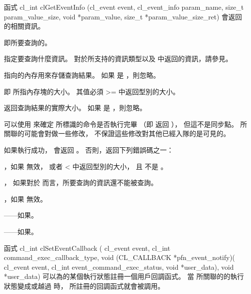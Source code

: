 函式
\startCLFUNC
cl_int clGetEventInfo (cl_event event,
			cl_event_info param_name,
			size_t param_value_size,
			void *param_value,
			size_t *param_value_size_ret)
\stopCLFUNC
會返回的相關資訊。

 即所要查詢的。

 指定要查詢什麼資訊。
對於所支持的資訊類型以及  中返回的資訊，請參見。

 指向的內存用來存儲查詢結果。
如果  是 ，則忽略。

 即  所指內存塊的大小。
其值必須 >= 中返回型別的大小。

 返回查詢結果的實際大小。
如果  是 ，則忽略。

{}

可以使用  來確定  所標識的命令是否執行完畢
（即  返回 ），
但這不是同步點。
  所關聯的可能會對做一些修改，
不保證這些修改對其他已經入隊的是可見的。

如果執行成功，  會返回 。
否則，返回下列錯誤碼之一：
\startigBase
\item {}，如果  無效，
或者  < 中返回型別的大小，
且  不是 。

\item {}，
如果對於  而言，所要查詢的資訊還不能被查詢。

\item {}，如果  無效。

\item {}——如果\scdevfailres。

\item {}——如果\schostfailres。
\stopigBase

函式
\startCLFUNC
cl_int clSetEventCallback (
		cl_event event,
		cl_int command_exec_callback_type,
		void (CL_CALLBACK *pfn_event_notify)(
			cl_event event,
			cl_int event_command_exec_status,
			void *user_data),
		void *user_data)
\stopCLFUNC
可以為的某個執行狀態註冊一個用戶回調函式。
當  所關聯的的執行狀態變成或越過  時，
所註冊的回調函式就會被調用。


